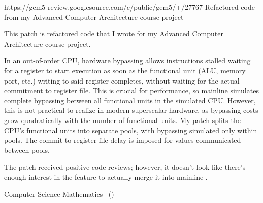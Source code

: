 \ifdefined\RESUME
{}%
{https://gem5-review.googlesource.com/c/public/gem5/+/27767}%
{Refactored  code from my Advanced Computer Architecture
course project}
\fi
\ifdefined\CV
{}

This patch is refactored  code that I wrote for my
Advanced Computer Architecture course project.

In an out-of-order CPU, hardware bypassing allows instructions stalled
waiting for a register to start execution as soon as the functional
unit (ALU, memory port, etc.) writing to said register completes,
without waiting for the actual commitment to register file. This is
crucial for performance, so mainline  simulates complete
bypassing between all functional units in the simulated CPU. However,
this is not practical to realize in modern superscalar hardware, as
bypassing costs grow quadratically with the number of functional
units. My patch splits the CPU's functional units into separate pools,
with bypassing simulated only within pools. The
commit-to-register-file delay is imposed for values communicated
between pools.

The patch received positive code reviews; however, it doesn't look
like there's enough interest in the feature to actually merge it into
mainline .


\fi
\filbreak

\ifdefined\CV
\newpage
{}

 Computer Science \hfill{}
Mathematics \hfill{} \GPA\ (\GpaDate)


